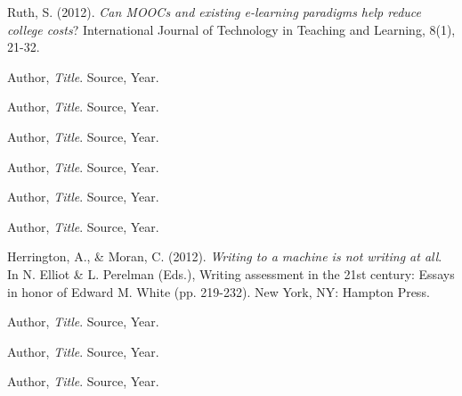 \documentclass[12pt, Arial]{article}
\begin{document}
\begin{thebibliography}{9}

  Ruth, S. (2012). \emph{Can MOOCs and existing e-learning paradigms help reduce college costs}? International Journal of Technology in Teaching and Learning, 8(1), 21-32.

  Author,
  \emph{Title}.
  Source,
  Year.

  Author,
  \emph{Title}.
  Source,
  Year.

  Author,
  \emph{Title}.
  Source,
  Year.

  Author,
  \emph{Title}.
  Source,
  Year.

  Author,
  \emph{Title}.
  Source,
  Year.

  Author,
  \emph{Title}.
  Source,
  Year.

  Herrington, A., \& Moran, C. (2012). \emph{Writing to a machine is not writing at all}. In N. Elliot \& L. Perelman (Eds.), Writing assessment in the 21st century: Essays in honor of Edward M. White (pp. 219-232). New York, NY: Hampton Press.

  Author,
  \emph{Title}.
  Source,
  Year.
  
Author,
  \emph{Title}.
  Source,
  Year.
  
Author,
  \emph{Title}.
  Source,
  Year.
  
\end{thebibliography}
\end{document}
